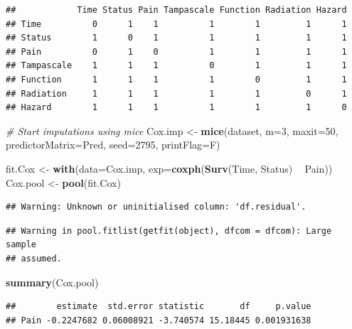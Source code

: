 \documentclass[]{book}
\newenvironment{Shaded}{\begin{snugshade}}{\end{snugshade}}
\newcommand{\KeywordTok}[1]{\textcolor[rgb]{0.13,0.29,0.53}{\textbf{#1}}}
\newcommand{\DataTypeTok}[1]{\textcolor[rgb]{0.13,0.29,0.53}{#1}}
\newcommand{\DecValTok}[1]{\textcolor[rgb]{0.00,0.00,0.81}{#1}}
\newcommand{\StringTok}[1]{\textcolor[rgb]{0.31,0.60,0.02}{#1}}
\newcommand{\CommentTok}[1]{\textcolor[rgb]{0.56,0.35,0.01}{\textit{#1}}}
\newcommand{\OperatorTok}[1]{\textcolor[rgb]{0.81,0.36,0.00}{\textbf{#1}}}
\newcommand{\NormalTok}[1]{#1}
\theoremstyle{definition}
\theoremstyle{definition}
\theoremstyle{definition}
\theoremstyle{remark}
\begin{document}
\begin{verbatim}
##            Time Status Pain Tampascale Function Radiation Hazard
## Time          0      1    1          1        1         1      1
## Status        1      0    1          1        1         1      1
## Pain          0      1    0          1        1         1      1
## Tampascale    1      1    1          0        1         1      1
## Function      1      1    1          1        0         1      1
## Radiation     1      1    1          1        1         0      1
## Hazard        1      1    1          1        1         1      0
\end{verbatim}

\begin{Shaded}
\begin{Highlighting}[]
\CommentTok{# Start imputations using mice}
\NormalTok{Cox.imp <-}\StringTok{ }\KeywordTok{mice}\NormalTok{(dataset, }\DataTypeTok{m=}\DecValTok{3}\NormalTok{, }\DataTypeTok{maxit=}\DecValTok{50}\NormalTok{, }\DataTypeTok{predictorMatrix=}\NormalTok{Pred, }\DataTypeTok{seed=}\DecValTok{2795}\NormalTok{, }\DataTypeTok{printFlag=}\NormalTok{F)}

\NormalTok{fit.Cox <-}\StringTok{ }\KeywordTok{with}\NormalTok{(}\DataTypeTok{data=}\NormalTok{Cox.imp, }\DataTypeTok{exp=}\KeywordTok{coxph}\NormalTok{(}\KeywordTok{Surv}\NormalTok{(Time, Status) }\OperatorTok{~}\StringTok{ }\NormalTok{Pain))}
\NormalTok{Cox.pool <-}\StringTok{ }\KeywordTok{pool}\NormalTok{(fit.Cox)}
\end{Highlighting}
\end{Shaded}

\begin{verbatim}
## Warning: Unknown or uninitialised column: 'df.residual'.
\end{verbatim}

\begin{verbatim}
## Warning in pool.fitlist(getfit(object), dfcom = dfcom): Large sample
## assumed.
\end{verbatim}

\begin{Shaded}
\begin{Highlighting}[]
\KeywordTok{summary}\NormalTok{(Cox.pool)}
\end{Highlighting}
\end{Shaded}

\begin{verbatim}
##        estimate  std.error statistic       df     p.value
## Pain -0.2247682 0.06008921 -3.740574 15.18445 0.001931638
\end{verbatim}
\end{document}
